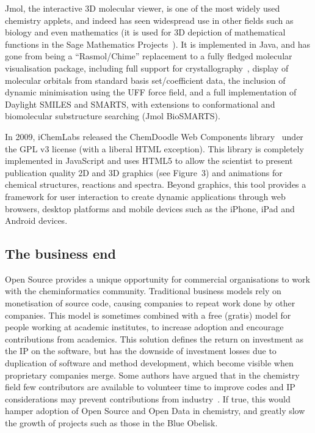 \documentclass[10pt]{bmc_article}
\newenvironment{bmcformat}{\begin{raggedright}\baselineskip20pt\sloppy\setboolean{publ}{false}}{\end{raggedright}\baselineskip20pt\sloppy}
\begin{document}
\begin{bmcformat}
Jmol, the interactive 3D molecular viewer, is one of the most widely used
chemistry applets, and indeed has
seen widespread use in other fields such as biology and 
even mathematics (it is used for 3D depiction of mathematical
functions in the Sage Mathematics Projects~\cite{WebSage}). It is implemented
in Java, and has gone from being a ``Rasmol/Chime'' replacement to a fully fledged molecular
visualisation package, including full support for crystallography~\cite{Hanson2010},
display of molecular orbitals from standard basis set/coefficient data,
the inclusion of dynamic minimisation using the UFF force field, and
a full implementation of Daylight SMILES and SMARTS, with extensions to
conformational and biomolecular substructure searching (Jmol
BioSMARTS).

In 2009, iChemLabs released the ChemDoodle Web Components
library~\cite{ChemDoodleWeb} under the GPL v3 license (with a
liberal HTML exception). This library is completely implemented in JavaScript
and uses HTML5 to allow the scientist
to present publication quality 2D and 3D graphics (see Figure~3) and animations for
chemical structures, reactions and spectra. Beyond graphics, this tool
provides a framework for user interaction to create dynamic
applications through web browsers, desktop platforms and mobile
devices such as the iPhone, iPad and Android devices.

\subsection*{The business end}


Open Source provides a unique opportunity for commercial organisations to work with the
cheminformatics community. Traditional business models rely on monetisation of source
code, causing companies to repeat work done by other companies. This
model is sometimes combined
with a free (gratis) model for people working at academic institutes, to increase adoption
and encourage contributions from academics. This solution defines the return on investment as the IP on the software,
but has the downside of investment losses due to duplication of
software and method development, which become visible when proprietary companies
merge. Some authors have argued that in the chemistry field
few contributors are available to volunteer time
to improve codes and IP considerations may prevent contributions from
industry~\cite{Stahl:2005fk}. If true, this would hamper
adoption of Open Source and Open Data in chemistry, and greatly slow
the growth of projects such as those in the Blue Obelisk.


\end{bmcformat}
\end{document}
